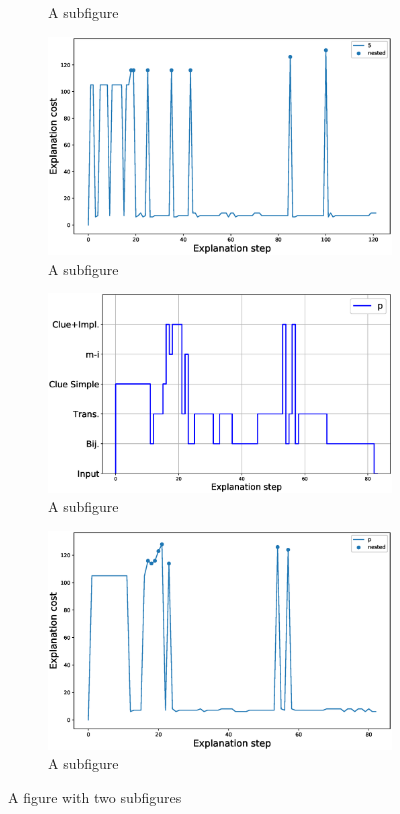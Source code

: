 \begin{figure}
\begin{subfigure}{.5\textwidth}
	\caption{A subfigure}
	\label{fig:sub1}
	\end{subfigure}%
	\begin{subfigure}{.5\textwidth}
	\centering
	\includegraphics[width=0.9\linewidth]{figures/5.eps}
	\caption{A subfigure}
	\label{fig:sub2}
	\end{subfigure}
	\begin{subfigure}{.5\textwidth}
		\centering
		\includegraphics[width=0.98\linewidth]{figures/plot_cost_steps_p.eps}
		\caption{A subfigure}
		\label{fig:sub1}
	\end{subfigure}%
	\begin{subfigure}{.5\textwidth}
		\centering
		\includegraphics[width=0.9\linewidth]{figures/p.eps}
		\caption{A subfigure}
		\label{fig:sub2}
	\end{subfigure}
\caption{A figure with two subfigures}
\label{fig:steps}
\end{figure}


